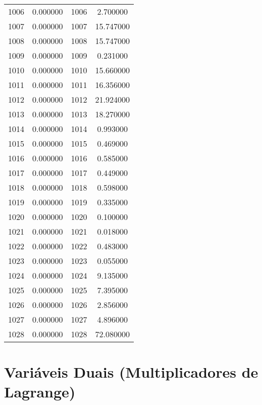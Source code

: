 \documentclass[12pt]{article}
\begin{document}
\begin{longtable}{@{}cccc@{}}
1006 & 0.000000 & 1006 & 2.700000 \\
1007 & 0.000000 & 1007 & 15.747000 \\
1008 & 0.000000 & 1008 & 15.747000 \\
1009 & 0.000000 & 1009 & 0.231000 \\
1010 & 0.000000 & 1010 & 15.660000 \\
1011 & 0.000000 & 1011 & 16.356000 \\
1012 & 0.000000 & 1012 & 21.924000 \\
1013 & 0.000000 & 1013 & 18.270000 \\
1014 & 0.000000 & 1014 & 0.993000 \\
1015 & 0.000000 & 1015 & 0.469000 \\
1016 & 0.000000 & 1016 & 0.585000 \\
1017 & 0.000000 & 1017 & 0.449000 \\
1018 & 0.000000 & 1018 & 0.598000 \\
1019 & 0.000000 & 1019 & 0.335000 \\
1020 & 0.000000 & 1020 & 0.100000 \\
1021 & 0.000000 & 1021 & 0.018000 \\
1022 & 0.000000 & 1022 & 0.483000 \\
1023 & 0.000000 & 1023 & 0.055000 \\
1024 & 0.000000 & 1024 & 9.135000 \\
1025 & 0.000000 & 1025 & 7.395000 \\
1026 & 0.000000 & 1026 & 2.856000 \\
1027 & 0.000000 & 1027 & 4.896000 \\
1028 & 0.000000 & 1028 & 72.080000 \\

\end{longtable}

\section{Variáveis Duais (Multiplicadores de Lagrange)}
\end{document}

